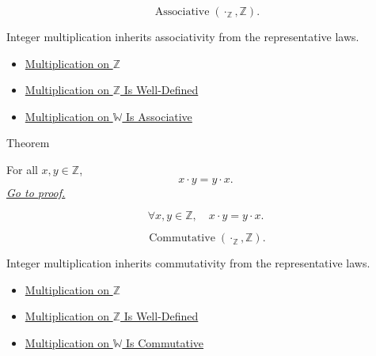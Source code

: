 \begin{remark*}
\[
\operatorname{Associative}(\cdot_{\mathbb{Z}},\mathbb{Z}).
\]
\end{remark*}

\begin{remark*}[Interpretation]
Integer multiplication inherits associativity from the representative laws.
\end{remark*}

\begin{dependencies}
\begin{itemize}
  \item \hyperref[def:multiplication-on-z-classes]{Multiplication on $\mathbb{Z}$}
  \item \hyperref[thm:multiplication-on-z-well-defined]{Multiplication on $\mathbb{Z}$ Is Well-Defined}
  \item \hyperref[thm:multiplication-on-w-associative]{Multiplication on $\mathbb{W}$ Is Associative}
\end{itemize}
\end{dependencies}

\begin{theorembox}{Theorem}
\begin{theorem}
\label{thm:multiplication-on-z-commutative}
For all $x,y\in\mathbb{Z}$,
\[
x\cdot y=y\cdot x.
\]
\hyperref[prf:multiplication-on-z-commutative]{\textit{Go to proof.}}
\end{theorem}
\end{theorembox}

\begin{remark*}
\[
\forall x,y\in\mathbb{Z},\quad x\cdot y=y\cdot x.
\]
\end{remark*}

\begin{remark*}
\[
\operatorname{Commutative}(\cdot_{\mathbb{Z}},\mathbb{Z}).
\]
\end{remark*}

\begin{remark*}[Interpretation]
Integer multiplication inherits commutativity from the representative laws.
\end{remark*}

\begin{dependencies}
\begin{itemize}
  \item \hyperref[def:multiplication-on-z-classes]{Multiplication on $\mathbb{Z}$}
  \item \hyperref[thm:multiplication-on-z-well-defined]{Multiplication on $\mathbb{Z}$ Is Well-Defined}
  \item \hyperref[thm:multiplication-on-w-commutative]{Multiplication on $\mathbb{W}$ Is Commutative}
\end{itemize}
\end{dependencies}

